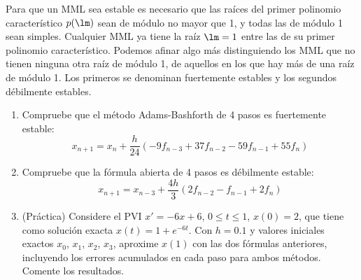 \begin{ejercicio}\label{ej:3.1.17}
    Para que un MML sea estable es necesario que las raíces del primer polinomio característico $p(\lm)$ sean de módulo no mayor que 1, y todas las de módulo 1 sean simples. Cualquier MML ya tiene la raíz $\lm = 1$ entre las de su primer polinomio característico. Podemos afinar algo más distinguiendo los MML que no tienen ninguna otra raíz de módulo 1, de aquellos en los que hay más de una raíz de módulo 1. Los primeros se denominan fuertemente estables y los segundos débilmente estables.
    \begin{enumerate}
        \item Compruebe que el método Adams-Bashforth de 4 pasos es fuertemente estable:
        \begin{equation*}
            x_{n+1} = x_n + \frac{h}{24} (-9 f_{n-3} + 37 f_{n-2} - 59 f_{n-1} + 55 f_n)
        \end{equation*}
        \item Compruebe que la fórmula abierta de 4 pasos es débilmente estable:
        \begin{equation*}
            x_{n+1} = x_{n-3} + \frac{4h}{3} (2 f_{n-2} - f_{n-1} + 2 f_n)
        \end{equation*}
        \item (Práctica) Considere el PVI $x' = -6x + 6$, $0 \leq t \leq 1$, $x(0) = 2$, que tiene como solución exacta $x(t) = 1 + e^{-6t}$. Con $h = 0.1$ y valores iniciales exactos $x_0$, $x_1$, $x_2$, $x_3$, aproxime $x(1)$ con las dos fórmulas anteriores, incluyendo los errores acumulados en cada paso para ambos métodos. Comente los resultados.
    \end{enumerate}
\end{ejercicio}